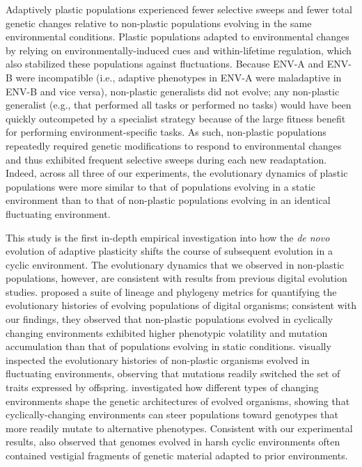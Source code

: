 Adaptively plastic populations experienced fewer selective sweeps and fewer total genetic changes relative to non-plastic populations evolving in the same environmental conditions.
Plastic populations adapted to environmental changes by relying on environmentally-induced cues and within-lifetime regulation, which also stabilized these populations against fluctuations. 
Because ENV-A and ENV-B were incompatible (i.e., adaptive phenotypes in ENV-A were maladaptive in ENV-B and vice versa), non-plastic generalists did not evolve; any non-plastic generalist (e.g., that performed all tasks or performed no tasks) would have been quickly outcompeted by a specialist strategy because of the large fitness benefit for performing environment-specific tasks.
As such, non-plastic populations repeatedly required genetic modifications to respond to environmental changes and thus exhibited frequent selective sweeps during each new readaptation.
Indeed, across all three of our experiments, the evolutionary dynamics of plastic populations were more similar to that of populations evolving in a static environment than to that of non-plastic populations evolving in an identical fluctuating environment.


This study is the first in-depth empirical investigation into how the \textit{de novo} evolution of adaptive plasticity shifts the course of subsequent evolution in a cyclic environment.
The evolutionary dynamics that we observed in non-plastic populations, however, are consistent with results from previous digital evolution studies. 
\cite{dolson_interpreting_2020} proposed a suite of lineage and phylogeny metrics for quantifying the evolutionary histories of evolving populations of digital organisms; consistent with our findings, they observed that non-plastic populations evolved in cyclically changing environments exhibited higher phenotypic volatility and mutation accumulation than that of populations evolving in static conditions.
\cite{lalejini_evolutionary_2016} visually inspected the evolutionary histories of non-plastic organisms evolved in fluctuating environments, observing that mutations readily switched the set of traits expressed by offspring.
\cite{canino-koning_evolution_2016} investigated how different types of changing environments shape the genetic architectures of evolved organisms, showing that cyclically-changing environments can steer populations toward genotypes that more readily mutate to alternative phenotypes.
Consistent with our experimental results, \cite{canino-koning_evolution_2016} also observed that genomes evolved in harsh cyclic environments often contained vestigial fragments of genetic material adapted to prior environments.

